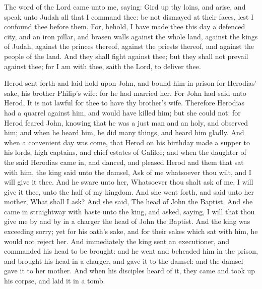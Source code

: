  The word of the Lord came unto me, saying: Gird up thy loins, and arise, and speak unto Judah all that I command thee: be not dismayed at their faces, lest I confound thee before them. For, behold, I have made thee this day a defenced city, and an iron pillar, and brasen walls against the whole land, against the kings of Judah, against the princes thereof, against the priests thereof, and against the people of the land. And they shall fight against thee; but they shall not prevail against thee; for I am with thee, saith the Lord, to deliver thee.


 Herod sent forth and laid hold upon John, and bound him in prison for Herodias' sake, his brother Philip’s wife: for he had married her. For John had said unto Herod, It is not lawful for thee to have thy brother’s wife. Therefore Herodias had a quarrel against him, and would have killed him; but she could not: for Herod feared John, knowing that he was a just man and an holy, and observed him; and when he heard him, he did many things, and heard him gladly. And when a convenient day was come, that Herod on his birthday made a supper to his lords, high captains, and chief estates of Galilee; and when the daughter of the said Herodias came in, and danced, and pleased Herod and them that sat with him, the king said unto the damsel, Ask of me whatsoever thou wilt, and I will give it thee. And he sware unto her, Whatsoever thou shalt ask of me, I will give it thee, unto the half of my kingdom. And she went forth, and said unto her mother, What shall I ask? And she said, The head of John the Baptist. And she came in straightway with haste unto the king, and asked, saying, I will that thou give me by and by in a charger the head of John the Baptist. And the king was exceeding sorry; yet for his oath’s sake, and for their sakes which sat with him, he would not reject her. And immediately the king sent an executioner, and commanded his head to be brought: and he went and beheaded him in the prison, and brought his head in a charger, and gave it to the damsel: and the damsel gave it to her mother. And when his disciples heard of it, they came and took up his corpse, and laid it in a tomb.

